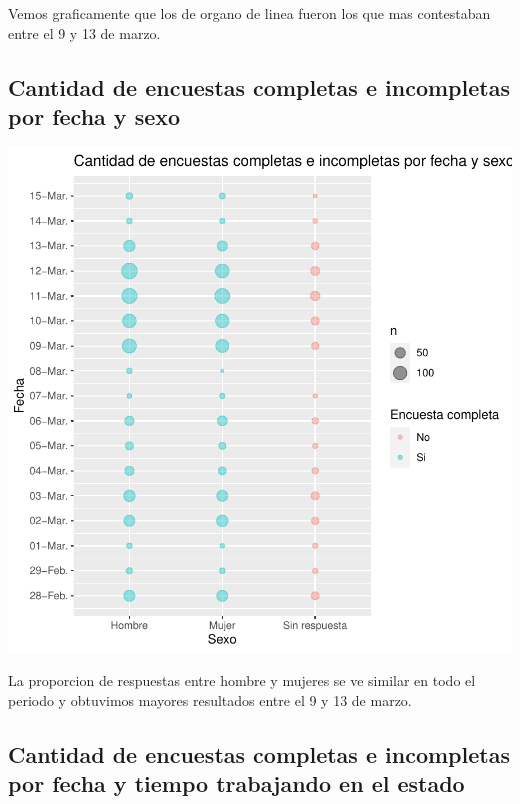 \documentclass{article}
\begin{document}
Vemos graficamente que los de organo de linea fueron los que mas contestaban entre el 9 y 13 de marzo.

\subsection{Cantidad de encuestas completas e incompletas por fecha y sexo}

\includegraphics{seguimientov3-036}

La proporcion de respuestas entre hombre y mujeres se ve similar en todo el periodo y obtuvimos mayores resultados entre el 9 y 13 de marzo.

\subsection{Cantidad de encuestas completas e incompletas por fecha y tiempo trabajando en el estado}
\end{document}

